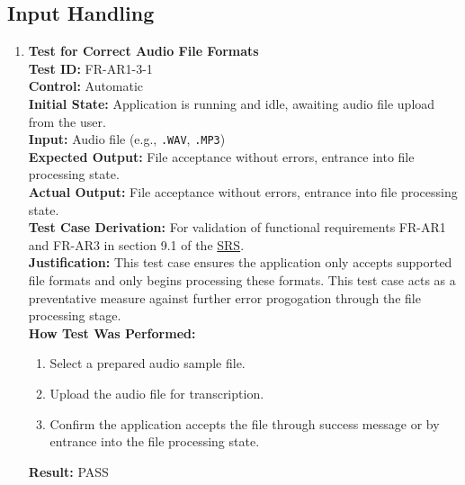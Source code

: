 \documentclass[12pt, titlepage]{article}
\begin{document}
  \subsection{Input Handling}
  \begin{enumerate}
    \item \textbf{Test for Correct Audio File Formats} \\
      \newline
      \textbf{Test ID:} FR-AR1-3-1 \\
      \textbf{Control:} Automatic \\
      \textbf{Initial State:} Application is running and idle, awaiting audio file upload from the user. \\
      \textbf{Input:} Audio file (e.g., \texttt{.WAV}, \texttt{.MP3}) \\
      \textbf{Expected Output:} File acceptance without errors, entrance into file processing state. \\
      \textbf{Actual Output:} File acceptance without errors, entrance into file processing state. \\
      \textbf{Test Case Derivation:} For validation of functional requirements FR-AR1 and FR-AR3 in section 9.1 of the 
      \href{https://github.com/emilyperica/ScoreGen/blob/main/docs/SRS-Volere/SRS.pdf}{SRS}. \\
      \textbf{Justification:} This test case ensures the application only accepts supported file formats and only begins processing 
      these formats. This test case acts as a preventative measure against further error progogation through the file processing stage.\\
      \textbf{How Test Was Performed:}
      \begin{enumerate}
          \item Select a prepared audio sample file.
          \item Upload the audio file for transcription.
          \item Confirm the application accepts the file through success message or by entrance into the file processing state.
      \end{enumerate}
      \textbf{Result:} PASS
  

\end{enumerate}
\end{document}
